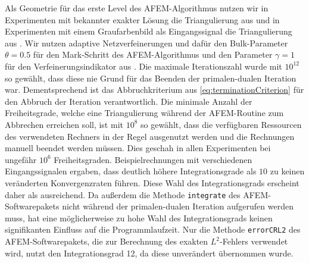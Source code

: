 Als Geometrie für das erste Level des AFEM-Al\-go\-rith\-mus nutzen wir in
Experimenten mit bekannter exakter Lösung die Triangulierung aus
 und in Experimenten mit einem Graufarbenbild als
Eingangssignal die Triangulierung aus .
Wir nutzen adaptive Netzverfeinerungen und dafür den Bulk-Parameter
$\theta=0.5$ für den Mark-Schritt des AFEM-Algorithmus und den Parameter
$\gamma=1$ für den Verfeinerungsindikator aus .
Die maximale Iterationszahl wurde mit $10^{12}$ so gewählt, dass diese nie
Grund für das Beenden der primalen-dualen Iteration war.
Dementsprechend ist das Abbruchkriterium aus \eqref{eq:terminationCriterion}
für den Abbruch der Iteration verantwortlich.
Die minimale Anzahl der Freiheitsgrade, welche eine Triangulierung während der
AFEM-Routine zum Abbrechen erreichen soll, ist mit $10^8$ so gewählt, dass die
verfügbaren Ressourcen des verwendeten Rechners in der Regel ausgenutzt
werden und die Rechnungen manuell beendet werden müssen.
Dies geschah in allen Experimenten bei ungefähr $10^6$ Freiheitsgraden.
Beispielrechnungen mit verschiedenen Eingangssignalen ergaben, dass deutlich
höhere Integrationsgrade als $10$ zu keinen veränderten Konvergenzraten
führen. 
Diese Wahl des Integrationsgrads erscheint daher als ausreichend.
Da außerdem die Methode \texttt{integrate} des AFEM-Softwarepakets \cite{Car09}
nicht während der primalen-dualen Iteration aufgerufen werden muss, hat eine
möglicherweise zu hohe Wahl des Integrationsgrads keinen signifikanten Einfluss
auf die Programmlaufzeit.
Nur die Methode \texttt{errorCRL2} des AFEM-Softwarepakets, die zur Berechnung
des exakten $L^2$-Fehlers verwendet wird, nutzt den Integrationsgrad 12, da
diese unverändert übernommen wurde.

